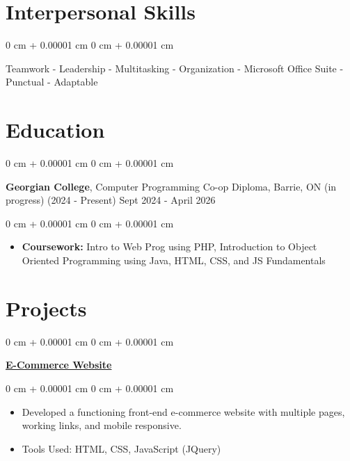 \documentclass[10pt, letterpaper]{article}
\newenvironment{highlights}{
    \begin{itemize}[
        topsep=0.10 cm,
        parsep=0.10 cm,
        partopsep=0pt,
        itemsep=0pt,
        leftmargin=0 cm + 10pt
    ]
}{
    \end{itemize}
} %
\newenvironment{highlightsforbulletentries}{
    \begin{itemize}[
        topsep=0.10 cm,
        parsep=0.10 cm,
        partopsep=0pt,
        itemsep=0pt,
        leftmargin=10pt
    ]
}{
    \end{itemize}
} %
\newenvironment{onecolentry}{
    \begin{adjustwidth}{
        0 cm + 0.00001 cm
    }{
        0 cm + 0.00001 cm
    }
}{
    \end{adjustwidth}
} %
\newenvironment{twocolentry}[2][]{
    \onecolentry
    \def\secondColumn{#2}
    \setcolumnwidth{\fill, 4.5 cm}
    \begin{paracol}{2}
}{
    \switchcolumn \raggedleft \secondColumn
    \end{paracol}
    \endonecolentry
} %
\begin{document}
       \section{Interpersonal Skills}

    \begin{onecolentry}
        \begin{highlightsforbulletentries}


      Teamwork - Leadership - Multitasking - Organization - Microsoft Office Suite - Punctual - Adaptable\end{highlightsforbulletentries} \end{onecolentry}

    \section{Education}



        
        \begin{twocolentry}{
            Sept 2024 - April 2026
        }
            \textbf{Georgian College}, Computer Programming Co-op Diploma, Barrie, ON (in progress) (2024 - Present)\end{twocolentry}

        \vspace{0.10 cm}
        \begin{onecolentry}
            \begin{highlights}
                
                \item \textbf{Coursework:} Intro to Web Prog using PHP, Introduction to Object Oriented Programming using Java, HTML, CSS, and JS Fundamentals
            \end{highlights}
        \end{onecolentry}


\section{Projects}

        
        \begin{onecolentry}
                    \href{https://github.com/Wasaidoun/HTML-Final}{\textbf{E-Commerce Website} \faGithub}
        \end{onecolentry}
        

        \vspace{0.10 cm}
        \begin{onecolentry}
            \begin{highlights}
                \item Developed a functioning front-end e-commerce website with multiple pages, working links, and mobile responsive.
                \item Tools Used: HTML, CSS, JavaScript (JQuery)
            \end{highlights}
        \end{onecolentry}
\end{document}
